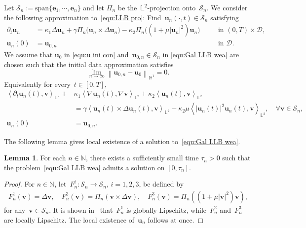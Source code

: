 \documentclass[11pt,reqno]{amsart}
\theoremstyle{definition}
\newtheorem{lemma}[theorem]{Lemma}
\numberwithin{equation}{section}
\newcommand{\bff}{\boldsymbol}
\newcommand{\bb}{\mathbb}
\newcommand{\pa}{\partial}
\newcommand{\nn}{\nonumber}
\newcommand{\norm}[2]{\left\|{#1}\right\|_{#2}}
\newcommand{\inpro}[2]{\left\langle#1,#2\right\rangle}
\begin{document}
Let $\mathcal{S}_n:=\text{span}\{\bff{e}_1,\cdots,\bff{e}_n\}$ and let
$\Pi_n$ be the~$\bb{L}^2$-projection onto~$\mathcal{S}_n$. We consider the following
approximation to~\eqref{equ:LLB pro}: Find~$\bff{u}_n(\cdot,t)\in\mathcal{S}_n$
satisfying
\begin{equation}\label{equ:Gal LLB wea}
\begin{alignedat}{2}
 \pa_t\bff{u}_n
&=
\kappa_1\Delta\bff{u}_n
+
\gamma\Pi_n\bigl(\bff{u}_n\times\Delta\bff{u}_n\bigr)
-
\kappa_2\Pi_n\bigl((1+\mu|\bff{u}_n|^2)\bff{u}_n\bigr)
&\quad &\text{in } (0,T) \times \mathscr{D},
\\
\bff{u}_n(0) &= \bff{u}_{0,n}
		&\quad &\text{in } \mathscr{D}.
\end{alignedat}
\end{equation}
We assume that $\bff{u}_0$ in \eqref{equ:u ini con} and~$\bff{u}_{0,n}\in\mathcal{S}_n$ in \eqref{equ:Gal LLB wea} are chosen such that the initial data approximation satisfies
\begin{equation}\label{equ:fur ass H1}
		\lim_{n\to\infty}
		\norm{\bff{u}_{0,n}-\bff{u}_0}{\bb{H}^1} = 0.
	\end{equation}
Equivalently for every~$t\in [0,T]$,
	\begin{subequations}\label{equ:LLB wea}
		\begin{alignat}{1}
			\inpro{\pa_t\bff{u}_n(t)}{\bff{v}}_{\bb{L}^2}
			+
			&\kappa_1 \inpro{\nabla\bff{u}_n(t)}{\nabla\bff{v}}_{\bb{L}^2}
			+
			\kappa_2
			\inpro{\bff{u}_n(t)}{\bff{v}}_{\bb{L}^2}
			\nn\\
			&=
			\gamma
			\inpro{\bff{u}_n(t)\times \Delta\bff{u}_n(t)}{\bff{v}}_{\bb{L}^2}
			-
			\kappa_2 \mu
			\inpro{|\bff{u}_n(t)|^2\bff{u}_n(t)}{\bff{v}}_{\bb{L}^2},
			\quad \forall\bff{v}\in\mathcal{S}_n,
			\label{equ:LLB wea equ}
			\\
			\bff{u}_n(0) &= \bff{u}_{0,n}.
			\label{equ:LLB wea con}
		\end{alignat}
	\end{subequations}


The following lemma gives local existence of a solution to~\eqref{equ:Gal LLB wea}.

\begin{lemma}\label{lem:loc exi}
For each $n\in\bb{N}$, there exists a sufficiently small time $\tau_n>0$ such that the problem~\eqref{equ:Gal LLB wea}
admits a solution on $[0,\tau_n]$.
\end{lemma}
\begin{proof}
For $n\in\bb{N}$, let~$F_n^i:\mathcal{S}_n\to\mathcal{S}_n$, $i=1,2,3$, be defined by
\begin{align*}
F_n^1(\bff{v}) = \Delta\bff{v}, \quad
F_n^2(\bff{v}) = \Pi_n(\bff{v}\times\Delta\bff{v}), \quad
F_n^3(\bff{v}) = \Pi_n((1+\mu|\bff{v}|^2)\bff{v}),
\end{align*}
for any~$\bff{v}\in\mathcal{S}_n$. It is shown in~\citep[Lemma 3.1]{Le16} that~$F_n^1$ is 
globally Lipschitz, while~$F_n^2$ and~$F_n^3$ are locally Lipschitz. The local
existence of~$\bff{u}_n$ follows at once.
\end{proof}
\end{document}
